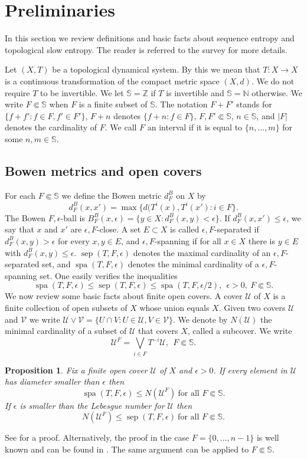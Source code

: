 \documentclass[a4paper,oneside]{amsart}
\renewcommand{\(}{\begin{dmath*}}
\renewcommand{\)}{\end{dmath*}}
\newtheorem{proposition}[theorem]{Proposition}
\theoremstyle{definition}
\newcommand{\N}{\mathbb{N}}
\newcommand{\Z}{\mathbb{Z}}
\newcommand{\SE}{\mathbb{S}}
\newcommand{\U}{\mathcal{U}}
\newcommand{\sep}{\operatorname{sep}}
\newcommand{\spa}{\operatorname{spa}}
\begin{document}
\section{Preliminaries}\label{sec:preliminaries}
In this section we review definitions and basic facts about sequence entropy and topological slow entropy. The reader is referred to the survey \cite{gogolev_survey_2024} for more details.

Let $(X,T)$ be a topological dynamical system. By this we mean that $T\colon X\to X$ is a continuous transformation of the compact metric space $(X,d)$. We do not require $T$ to be invertible.  We let $\SE=\Z$ if $T$ is invertible and $\SE=\N$ otherwise. We write $F\Subset \SE$ when $F$ is a finite subset of $\SE$. The notation $F+F'$ stands for $\{f+f' : f\in F, f'\in F'\}$, $F+n$ denotes  $\{f+n : f\in F\}$, $F,F'\Subset \SE$, $n\in\SE$, and $|F|$ denotes the cardinality of $F$. We call $F$ an interval if it is equal to $\{n,\dots,m\}$ for some $n,m\in\SE$.
\subsection{Bowen metrics and open covers}
For each $F\Subset \SE$ we define the Bowen metric $d^B_F$ on $X$ by
\[d^B_{F}(x,x')=\max\{d(T^{i}(x),T^{i}(x'): i\in F\}.\]
The Bowen $F,\epsilon$-ball is  $B^B_F(x,\epsilon)=\{y\in X: d_F^B(x,y)<\epsilon\}$. If $d^B_{F}(x,x')\leq \epsilon$, we say that $x$ and $x'$ are $\epsilon,F$-close. A set $E\subset X$ is called $\epsilon,F$-separated if $d^B_F(x,y)>\epsilon$ for every $x,y \in E$, and $\epsilon,F$-spanning if for all $x\in X$ there is $y\in E$ with $d^B_F(x,y)\leq\epsilon$. $\sep(T,F,\epsilon)$ denotes the maximal cardinality of an $\epsilon,F$-separated set, and  $\spa(T,F,\epsilon)$ denotes the minimal cardinality of a $\epsilon,F$-spanning set. One easily verifies the inequalities
\begin{equation}\label{sep-and-spa}\spa(T,F,\epsilon)\leq \sep(T,F,\epsilon)\leq \spa(T,F,\epsilon/2), \ \ \epsilon>0, \ F\Subset\SE.
\end{equation}  
We now review some basic facts about finite open covers. A cover $\U$ of $X$ is a finite collection of open subsets of $X$ whose union equals $X$. Given two covers $\U$ and $\mathcal V$ we write $\U\vee \mathcal V=\{U\cap V : U\in \U, V\in \mathcal V\}$.  We denote by $N(\U)$ the minimal cardinality of a subset of $\U$ that covers $X$, called a subcover. We write \[\U^F = \bigvee_{i\in F}T^{-i}\U, \ \ F\Subset \SE.\] 
\begin{proposition}\label{wellknown}
Fix a finite open cover $\U$ of $X$ and $\epsilon>0$. If every element in $\U$ has diameter smaller than $\epsilon$ then
    \[\spa(T,F,\epsilon)\leq N(\U^F) \ \text{for all }F\Subset \SE.\]
If $\epsilon$ is smaller than the  Lebesgue number for $\U$ then
    \[N(\U^F)\leq\sep(T,F,\epsilon) \ \text{for all }F\Subset \SE.
    \]
\end{proposition}See \cite[Lemma 9.37]{kerr_ergodic_2016} for a proof. Alternatively, the proof in the case $F=\{0,\dots,n-1\}$ is well known and can be found in \cite[Proposition 3.8, Chapter 6]{petersen_ergodic_1983}. The same argument can be applied to  $F\Subset\SE$. 
\end{document}
